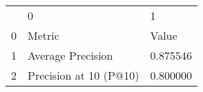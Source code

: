 \begin{tabular}{lll}
 & 0 & 1 \\
0 & Metric & Value \\
1 & Average Precision & 0.875546 \\
2 & Precision at 10 (P@10) & 0.800000 \\
\end{tabular}
